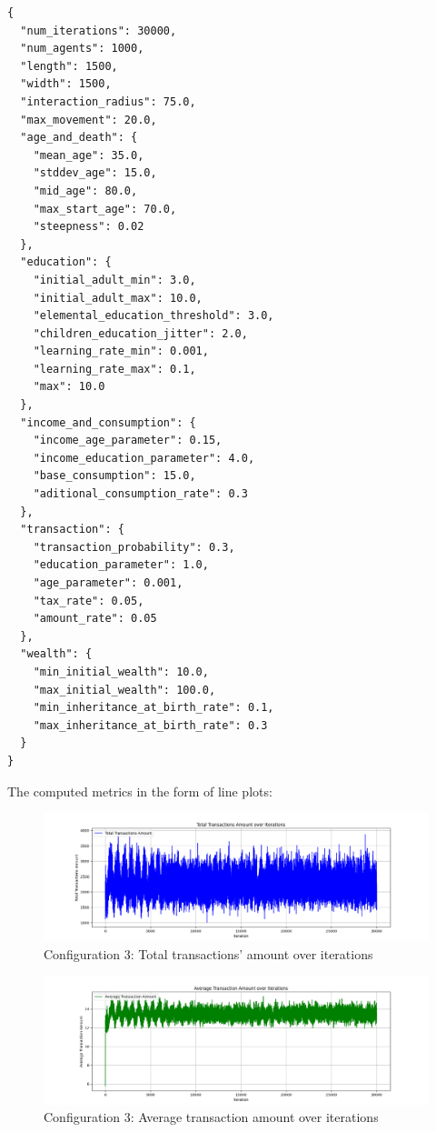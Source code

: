\documentclass[english]{projectreport}
\begin{document}
    \begin{verbatim}
{
  "num_iterations": 30000,
  "num_agents": 1000,
  "length": 1500,
  "width": 1500,
  "interaction_radius": 75.0,
  "max_movement": 20.0,
  "age_and_death": {
    "mean_age": 35.0,
    "stddev_age": 15.0,
    "mid_age": 80.0,
    "max_start_age": 70.0,
    "steepness": 0.02
  },
  "education": {
    "initial_adult_min": 3.0,
    "initial_adult_max": 10.0,
    "elemental_education_threshold": 3.0,
    "children_education_jitter": 2.0,
    "learning_rate_min": 0.001,
    "learning_rate_max": 0.1,
    "max": 10.0
  },
  "income_and_consumption": {
    "income_age_parameter": 0.15,
    "income_education_parameter": 4.0,
    "base_consumption": 15.0,
    "aditional_consumption_rate": 0.3
  },
  "transaction": {
    "transaction_probability": 0.3,
    "education_parameter": 1.0,
    "age_parameter": 0.001,
    "tax_rate": 0.05,
    "amount_rate": 0.05
  },
  "wealth": {
    "min_initial_wealth": 10.0,
    "max_initial_wealth": 100.0,
    "min_inheritance_at_birth_rate": 0.1,
    "max_inheritance_at_birth_rate": 0.3
  }
}
    \end{verbatim}

    The computed metrics in the form of line plots:

    \begin{figure}[H]
        \centering
        \includegraphics[width=0.8\linewidth]{metrics_config3/metrics_config3_total_transactions_amount.png}
        \caption{Configuration 3: Total transactions' amount over iterations}
        \label{fig:c0-total_transactions_amount}
    \end{figure}

    \begin{figure}[H]
        \centering
        \includegraphics[width=0.8\linewidth]{metrics_config3/metrics_config3_average_transaction_amount.png}
        \caption{Configuration 3: Average transaction amount over iterations}
        \label{fig:c0-average_transaction_amount}
    \end{figure}
\end{document}
